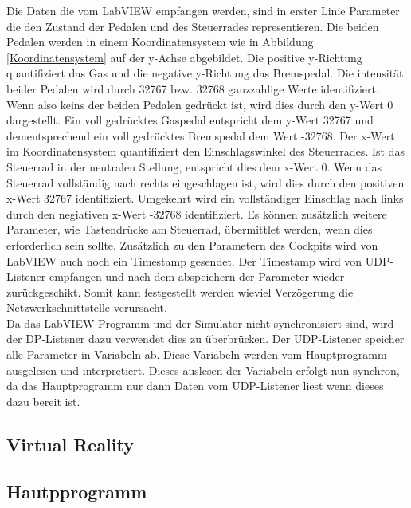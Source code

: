 Die Daten die vom LabVIEW empfangen werden, sind in erster Linie Parameter die den Zustand der Pedalen und des Steuerrades representieren. Die beiden Pedalen werden in einem Koordinatensystem wie in Abbildung \ref{Koordinatensystem} auf der y-Achse abgebildet. Die positive y-Richtung quantifiziert das Gas und die negative y-Richtung das Bremspedal. Die intensität beider Pedalen wird durch 32767 bzw. 32768 ganzzahlige Werte identifiziert. Wenn also keins der beiden Pedalen gedrückt ist, wird dies durch den y-Wert 0 dargestellt. Ein voll gedrücktes Gaspedal entspricht dem y-Wert 32767 und dementsprechend ein voll gedrücktes Bremspedal dem Wert -32768. Der x-Wert im Koordinatensystem quantifiziert den Einschlagswinkel des Steuerrades. Ist das Steuerrad in der neutralen Stellung, entspricht dies dem x-Wert 0. Wenn das Steuerrad vollständig nach rechts eingeschlagen ist, wird dies durch den positiven x-Wert 32767 identifiziert. Umgekehrt wird ein vollständiger Einschlag nach links durch den negiativen x-Wert -32768 identifiziert. Es können zusätzlich weitere Parameter, wie Tastendrücke am Steuerrad, übermittlet werden, wenn dies erforderlich sein sollte. Zusätzlich zu den Parametern des Cockpits wird von LabVIEW auch noch ein Timestamp gesendet. Der Timestamp wird von UDP-Listener empfangen und nach dem abspeichern der Parameter wieder zurückgeschikt. Somit kann festgestellt werden wieviel Verzögerung die Netzwerkschnittstelle verursacht. \\
Da das LabVIEW-Programm und der Simulator nicht synchronisiert sind, wird der DP-Listener dazu verwendet dies zu überbrücken. Der UDP-Listener speicher alle Parameter in Variabeln ab. Diese Variabeln werden vom Hauptprogramm ausgelesen und interpretiert. Dieses auslesen der Variabeln erfolgt nun synchron, da das Hauptprogramm nur dann Daten vom UDP-Listener liest wenn dieses dazu bereit ist.

\subsection{Virtual Reality}
\subsection{Hautpprogramm}





